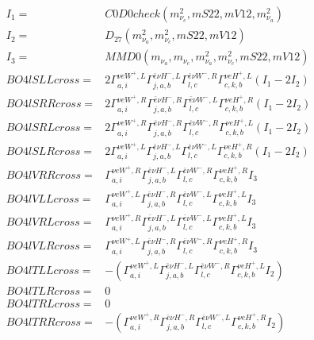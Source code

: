 \documentclass[A4,landscape]{article}
\begin{document}
\begin{align} 
I_1 = & C0D0check(m^2_{\nu_{{c}}}, mS22, mV12, m^2_{\nu_{{a}}}) \\ 
I_2 = & D_{27}(m^2_{\nu_{{a}}}, m^2_{\nu_{{c}}}, mS22, mV12) \\ 
I_3 = & MMD0(m_{\nu_{{a}}}, m_{\nu_{{c}}}, m^2_{\nu_{{a}}}, m^2_{\nu_{{c}}}, mS22, mV12) \\ 
  BO4lSLLcross= & 2  \Gamma^{\nu e W^+,L}_{a, i} \Gamma^{\bar{e}\nu H^- ,L}_{j, a, b} \Gamma^{\bar{e}\nu W^- ,R}_{l, c} \Gamma^{\nu e H^+,L}_{c, k, b} (I_1 - 2 I_2) \\ 
  BO4lSRRcross= & 2  \Gamma^{\nu e W^+,R}_{a, i} \Gamma^{\bar{e}\nu H^- ,R}_{j, a, b} \Gamma^{\bar{e}\nu W^- ,L}_{l, c} \Gamma^{\nu e H^+,R}_{c, k, b} (I_1 - 2 I_2) \\ 
  BO4lSRLcross= & 2  \Gamma^{\nu e W^+,R}_{a, i} \Gamma^{\bar{e}\nu H^- ,R}_{j, a, b} \Gamma^{\bar{e}\nu W^- ,R}_{l, c} \Gamma^{\nu e H^+,L}_{c, k, b} (I_1 - 2 I_2) \\ 
  BO4lSLRcross= & 2  \Gamma^{\nu e W^+,L}_{a, i} \Gamma^{\bar{e}\nu H^- ,L}_{j, a, b} \Gamma^{\bar{e}\nu W^- ,L}_{l, c} \Gamma^{\nu e H^+,R}_{c, k, b} (I_1 - 2 I_2) \\ 
  BO4lVRRcross= &  \Gamma^{\nu e W^+,R}_{a, i} \Gamma^{\bar{e}\nu H^- ,L}_{j, a, b} \Gamma^{\bar{e}\nu W^- ,R}_{l, c} \Gamma^{\nu e H^+,R}_{c, k, b} I_3 \\ 
  BO4lVLLcross= &  \Gamma^{\nu e W^+,L}_{a, i} \Gamma^{\bar{e}\nu H^- ,R}_{j, a, b} \Gamma^{\bar{e}\nu W^- ,L}_{l, c} \Gamma^{\nu e H^+,L}_{c, k, b} I_3 \\ 
  BO4lVRLcross= &  \Gamma^{\nu e W^+,R}_{a, i} \Gamma^{\bar{e}\nu H^- ,L}_{j, a, b} \Gamma^{\bar{e}\nu W^- ,L}_{l, c} \Gamma^{\nu e H^+,L}_{c, k, b} I_3 \\ 
  BO4lVLRcross= &  \Gamma^{\nu e W^+,L}_{a, i} \Gamma^{\bar{e}\nu H^- ,R}_{j, a, b} \Gamma^{\bar{e}\nu W^- ,R}_{l, c} \Gamma^{\nu e H^+,R}_{c, k, b} I_3 \\ 
  BO4lTLLcross= & -( \Gamma^{\nu e W^+,L}_{a, i} \Gamma^{\bar{e}\nu H^- ,L}_{j, a, b} \Gamma^{\bar{e}\nu W^- ,R}_{l, c} \Gamma^{\nu e H^+,L}_{c, k, b} I_2) \\ 
  BO4lTLRcross= & 0 \\ 
  BO4lTRLcross= & 0 \\ 
  BO4lTRRcross= & -( \Gamma^{\nu e W^+,R}_{a, i} \Gamma^{\bar{e}\nu H^- ,R}_{j, a, b} \Gamma^{\bar{e}\nu W^- ,L}_{l, c} \Gamma^{\nu e H^+,R}_{c, k, b} I_2) \\ 
\end{align} 
\end{document}
